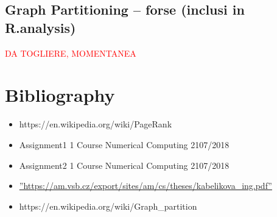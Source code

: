 \documentclass[]{usiinfbachelorproject}
\makeatletter
\def\BState{\State\hskip-\ALG@thistlm}
\makeatother
\begin{document}
\subsection{Graph Partitioning -- forse (inclusi in R.analysis)}

\textcolor{red}{DA TOGLIERE, MOMENTANEA}
\section{Bibliography}
\begin{itemize}
\item https://en.wikipedia.org/wiki/PageRank
\item Assignment1 1 Course Numerical Computing 2107/2018
\item Assignment2 1 Course Numerical Computing 2107/2018
\item \hyperref[label_name]{''https://am.vsb.cz/export/sites/am/cs/theses/kabelikova\_ing.pdf''}
\item https://en.wikipedia.org/wiki/Graph\_partition
\end{itemize}









 
 


\end{document}
